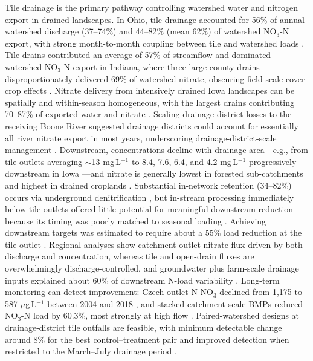 Tile drainage is the primary pathway controlling watershed water and nitrogen export in drained landscapes. In Ohio, tile drainage accounted for 56\% of annual watershed discharge (37--74\%) and 44--82\% (mean 62\%) of watershed NO$_3$-N export, with strong month-to-month coupling between tile and watershed loads \parencite{Williams2015}. Tile drains contributed an average of 57\% of streamflow and dominated watershed NO$_3$-N export in Indiana, where three large county drains disproportionately delivered 69\% of watershed nitrate, obscuring field-scale cover-crop effects \parencite{Grose2022}. Nitrate delivery from intensively drained Iowa landscapes can be spatially and within-season homogeneous, with the largest drains contributing 70--87\% of exported water and nitrate \parencite{Coupe2020}. Scaling drainage-district losses to the receiving Boone River suggested drainage districts could account for essentially all river nitrate export in most years, underscoring drainage-district-scale management \parencite{Ikenberry2014}. Downstream, concentrations decline with drainage area---e.g., from tile outlets averaging $\sim$13 mg\,L$^{-1}$ to 8.4, 7.6, 6.4, and 4.2 mg\,L$^{-1}$ progressively downstream in Iowa \parencite{Schilling2012b}---and nitrate is generally lowest in forested sub-catchments and highest in drained croplands \parencite{Billy2013}. Substantial in-network retention (34--82\%) occurs via underground denitrification \parencite{Billy2011}, but in-stream processing immediately below tile outlets offered little potential for meaningful downstream reduction because its timing was poorly matched to seasonal loading \parencite{Schilling2012b}. Achieving downstream targets was estimated to require about a 55\% load reduction at the tile outlet \parencite{Schilling2012b}. Regional analyses show catchment-outlet nitrate flux driven by both discharge and concentration, whereas tile and open-drain fluxes are overwhelmingly discharge-controlled, and groundwater plus farm-scale drainage inputs explained about 60\% of downstream N-load variability \parencite{Goeller2019}. Long-term monitoring can detect improvement: Czech outlet N-NO$_3$ declined from 1,175 to 587 $\mu$g\,L$^{-1}$ between 2004 and 2018 \parencite{Fraindová2022}, and stacked catchment-scale BMPs reduced NO$_3$-N load by 60.3\%, most strongly at high flow \parencite{Law2022}. Paired-watershed designs at drainage-district tile outfalls are feasible, with minimum detectable change around 8\% for the best control--treatment pair and improved detection when restricted to the March--July drainage period \parencite{Schilling2013}.


